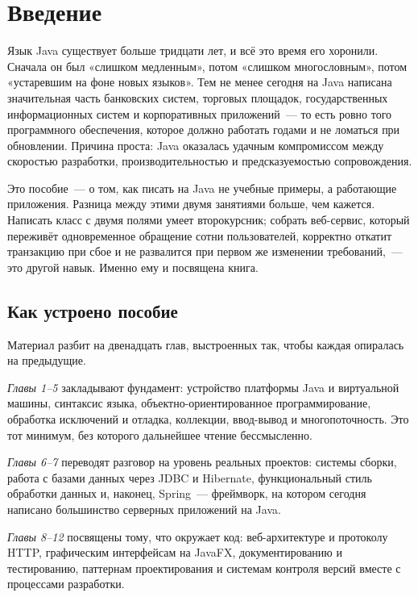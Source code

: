 \chapter*{Введение}

Язык Java существует больше тридцати лет, и всё это время его хоронили. Сначала он
был «слишком медленным», потом «слишком многословным», потом «устаревшим на фоне
новых языков». Тем не менее сегодня на Java написана значительная часть банковских
систем, торговых площадок, государственных информационных систем и корпоративных
приложений~--- то есть ровно того программного обеспечения, которое должно работать
годами и не ломаться при обновлении. Причина проста: Java оказалась удачным
компромиссом между скоростью разработки, производительностью и предсказуемостью
сопровождения.

Это пособие~--- о том, как писать на Java не учебные примеры, а работающие
приложения. Разница между этими двумя занятиями больше, чем кажется. Написать класс
с двумя полями умеет второкурсник; собрать веб-сервис, который переживёт
одновременное обращение сотни пользователей, корректно откатит транзакцию при сбое
и не развалится при первом же изменении требований,~--- это другой навык. Именно ему
и посвящена книга.

\section*{Как устроено пособие}

Материал разбит на двенадцать глав, выстроенных так, чтобы каждая опиралась на
предыдущие.

\emph{Главы 1--5} закладывают фундамент: устройство платформы Java и виртуальной
машины, синтаксис языка, объектно-ориентированное программирование, обработка
исключений и отладка, коллекции, ввод-вывод и многопоточность. Это тот минимум,
без которого дальнейшее чтение бессмысленно.

\emph{Главы 6--7} переводят разговор на уровень реальных проектов: системы сборки,
работа с базами данных через JDBC и Hibernate, функциональный стиль обработки
данных и, наконец, Spring~--- фреймворк, на котором сегодня написано большинство
серверных приложений на Java.

\emph{Главы 8--12} посвящены тому, что окружает код: веб-архитектуре и протоколу
HTTP, графическим интерфейсам на JavaFX, документированию и тестированию,
паттернам проектирования и системам контроля версий вместе с процессами
разработки.

